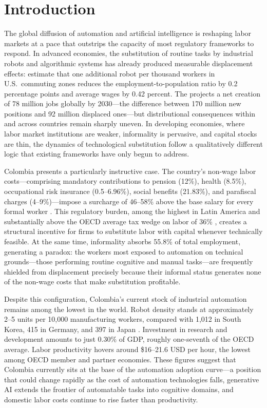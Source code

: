 \documentclass{article}
\begin{document}
\section{Introduction}
\label{sec:introduction}

The global diffusion of automation and artificial intelligence is reshaping labor markets at a pace that outstrips the capacity of most regulatory frameworks to respond. In advanced economies, the substitution of routine tasks by industrial robots and algorithmic systems has already produced measurable displacement effects: \cite{acemoglu2020robots} estimate that one additional robot per thousand workers in U.S.\ commuting zones reduces the employment-to-population ratio by 0.2 percentage points and average wages by 0.42 percent. The \cite{wef2025} projects a net creation of 78 million jobs globally by 2030---the difference between 170 million new positions and 92 million displaced ones---but distributional consequences within and across countries remain sharply uneven. In developing economies, where labor market institutions are weaker, informality is pervasive, and capital stocks are thin, the dynamics of technological substitution follow a qualitatively different logic that existing frameworks have only begun to address.

Colombia presents a particularly instructive case. The country's non-wage labor costs---comprising mandatory contributions to pension (12\%), health (8.5\%), occupational risk insurance (0.5--6.96\%), social benefits (21.83\%), and parafiscal charges (4--9\%)---impose a surcharge of 46--58\% above the base salary for every formal worker \cite{anif2018}. This regulatory burden, among the highest in Latin America and substantially above the OECD average tax wedge on labor of 36\% \cite{oecd2025voces}, creates a structural incentive for firms to substitute labor with capital whenever technically feasible. At the same time, informality absorbs 55.8\% of total employment, generating a paradox: the workers most exposed to automation on technical grounds---those performing routine cognitive and manual tasks---are frequently shielded from displacement precisely because their informal status generates none of the non-wage costs that make substitution profitable.

Despite this configuration, Colombia's current stock of industrial automation remains among the lowest in the world. Robot density stands at approximately 2--5 units per 10,000 manufacturing workers, compared with 1,012 in South Korea, 415 in Germany, and 397 in Japan \cite{ifr2024}. Investment in research and development amounts to just 0.30\% of GDP, roughly one-seventh of the OECD average. Labor productivity hovers around \$16--21.6 USD per hour, the lowest among OECD member and partner economies. These figures suggest that Colombia currently sits at the base of the automation adoption curve---a position that could change rapidly as the cost of automation technologies falls, generative AI extends the frontier of automatable tasks into cognitive domains, and domestic labor costs continue to rise faster than productivity.
\end{document}
